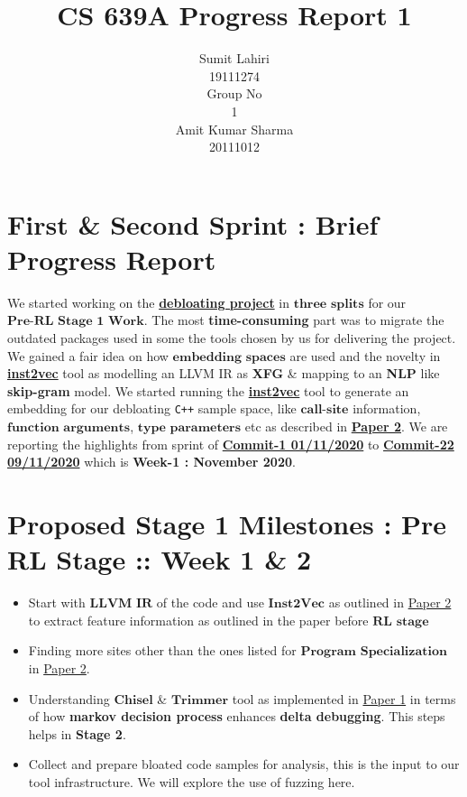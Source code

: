 \documentclass{article} %
\title{CS 639A Progress Report 1}
\author{
Sumit Lahiri \\
19111274 \\
\And
Group No\\
1\\
\And
Amit Kumar Sharma \\
20111012\\
}
\begin{document}
\maketitle

\section*{First \& Second Sprint : Brief Progress Report}
We started working on the \textbf{\href{https://github.com/lahiri-phdworks/reinforcedlearning-debloater}{debloating project}} in $\textbf{three splits}$ for our $\textbf{Pre-RL Stage 1 Work}$. The most \textbf{time-consuming} part was to migrate the outdated packages used in some the tools chosen by us for delivering the project. We gained a fair idea on how $\textbf{embedding spaces}$ are used and the novelty in \textbf{\href{https://github.com/lahiri-phdworks/ncc}{inst2vec}} tool as modelling an LLVM IR as \textbf{XFG} \& mapping to an \textbf{NLP} like \textbf{skip-gram} model. We started running the \textbf{\href{https://github.com/lahiri-phdworks/ncc}{inst2vec}} tool to generate an embedding for our debloating \texttt{C++} sample space, like $\textbf{call-site}$ information, $\textbf{function arguments}$, $\textbf{type parameters}$ etc as described in \textbf{\href{http://www.csl.sri.com/users/gehani/papers/MLSys-2019.DeepOCCAM.pdf}{Paper 2}}. We are reporting the highlights from sprint of \textbf{\href{https://github.com/lahiri-phdworks/reinforcedlearning-debloater/commit/dd63911895cb31cdc77c9debd57090422ffb3b65}{Commit-1 01/11/2020}} to 
\textbf{\href{https://github.com/lahiri-phdworks/reinforcedlearning-debloater/commit/8066e7b7b7fa7513e3611e3f3aee6fb72c81ea83}{Commit-22 09/11/2020}} which is \textbf{Week-1 : November 2020}.

\section*{\color{azure(colorwheel)} Proposed Stage 1 Milestones : Pre RL Stage :: Week 1 \& 2}
\begin{itemize}
	\item Start with $\textbf{LLVM IR}$ of the code and use $\textbf{Inst2Vec}$ as outlined in \href{http://www.csl.sri.com/users/gehani/papers/MLSys-2019.DeepOCCAM.pdf}{Paper 2} to extract feature information as outlined in the paper before $\textbf{RL stage}$
	\item Finding more sites other than the ones listed for $\textbf{Program Specialization}$ in \href{http://www.csl.sri.com/users/gehani/papers/MLSys-2019.DeepOCCAM.pdf}{Paper 2}.  
	\item Understanding $\textbf{Chisel}$ \& $\textbf{Trimmer}$ tool as implemented in \href{https://dl.acm.org/doi/10.1145/3243734.3243838}{Paper 1} in terms of how \textbf{markov decision process} enhances \textbf{delta debugging}. This steps helps in \textbf{Stage 2}.
	\item Collect and prepare bloated code samples for analysis, this is the input to our tool infrastructure. We will explore the use of fuzzing here.  
\end{itemize}
\end{document}
